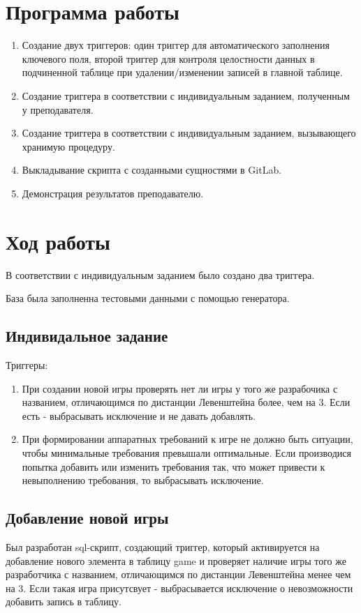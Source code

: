 \documentclass[a4paper,14pt]{extarticle}
\begin{document}
\section{Программа работы}
\begin{enumerate}
	\item Создание двух триггеров: один триггер для автоматического заполнения ключевого поля, второй триггер для контроля целостности данных в подчиненной таблице при удалении/изменении записей в главной таблице.
	\item Создание триггера в соответствии с индивидуальным заданием, полученным у преподавателя.
	\item Создание триггера в соответствии с индивидуальным заданием, вызывающего хранимую процедуру.
	\item Выкладывание скрипта с созданными сущностями в GitLab.
	\item Демонстрация результатов преподавателю.
\end{enumerate}

\section{Ход работы}
В соответствии с индивидуальным заданием было создано два триггера.

База была заполненна тестовыми данными с помощью генератора.

\subsection{Индивидальное задание}
Триггеры:
\begin{enumerate}
	\item При создании новой игры проверять нет ли игры у того же разрабочика с названием, отличающимся по дистанции Левенштейна более, чем на 3. Если есть - выбрасывать исключение и не давать добавлять.
	\item При формировании аппаратных требований к игре не должно быть ситуации, чтобы минимальные требования превышали оптимальные. Если производися попытка добавить или изменить требования так, что может привести к невыполнению требования, то выбрасывать исключение.
\end{enumerate}

\subsection{Добавление новой игры}
Был разработан sql-скрипт, создающий триггер, который активируется на добавление нового элемента в таблицу game и проверяет наличие игры того же разработчика с названием, отличающимся по дистанции Левенштейна менее чем на 3. Если такая игра присутсвует - выбрасывается исключение о невозможности добавить запись в таблицу.
\end{document}
